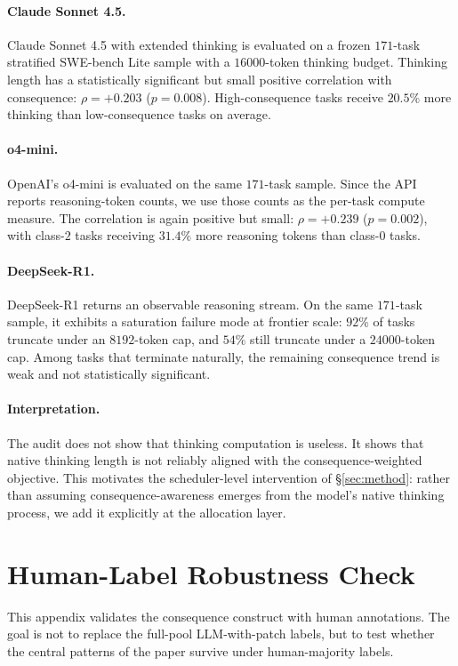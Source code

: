 \documentclass{article}
\begin{document}
\paragraph{Claude Sonnet 4.5.}
Claude Sonnet 4.5 with extended thinking is evaluated on a frozen
$171$-task stratified SWE-bench Lite sample with a $16000$-token
thinking budget. Thinking length has a statistically significant but
small positive correlation with consequence:
$\rho=+0.203$ ($p=0.008$). High-consequence tasks receive $20.5\%$
more thinking than low-consequence tasks on average.

\paragraph{o4-mini.}
OpenAI's o4-mini is evaluated on the same $171$-task sample. Since the
API reports reasoning-token counts, we use those counts as the
per-task compute measure. The correlation is again positive but small:
$\rho=+0.239$ ($p=0.002$), with class-$2$ tasks receiving $31.4\%$
more reasoning tokens than class-$0$ tasks.

\paragraph{DeepSeek-R1.}
DeepSeek-R1 returns an observable reasoning stream. On the same
$171$-task sample, it exhibits a saturation failure mode at frontier
scale: $92\%$ of tasks truncate under an $8192$-token cap, and $54\%$
still truncate under a $24000$-token cap. Among tasks that terminate
naturally, the remaining consequence trend is weak and not
statistically significant.

\paragraph{Interpretation.}
The audit does not show that thinking computation is useless. It shows
that native thinking length is not reliably aligned with the
consequence-weighted objective. This motivates the scheduler-level
intervention of \S\ref{sec:method}: rather than assuming
consequence-awareness emerges from the model's native thinking process,
we add it explicitly at the allocation layer.

\section{Human-Label Robustness Check}
\label{app:iaa}

This appendix validates the consequence construct with human
annotations. The goal is not to replace the full-pool LLM-with-patch
labels, but to test whether the central patterns of the paper survive
under human-majority labels.
\end{document}
